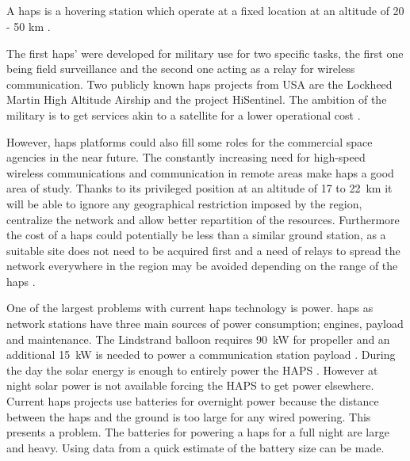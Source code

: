 \newpage 
\subsection{}
A \gls{haps} is a hovering station which operate at a fixed location at an altitude of 20 - 50 km \citep{manual:radio_regulation}.

The first \gls{haps}' were developed for military use for two specific tasks, the first one being field surveillance and the second one acting as a relay for wireless communication. 
Two publicly known \gls{haps} projects from USA are the Lockheed Martin High Altitude Airship and the project HiSentinel. The ambition of the military is to get services akin to a satellite for a lower operational cost \citep{article:Different_models_HAPS}.

However, \gls{haps} platforms could also fill some roles for the commercial space agencies in the near future. The constantly increasing need for high-speed wireless communications and communication in remote areas make \gls{haps} a good area of study. 
Thanks to its privileged position at an altitude of 17 to \SI{22}{km} it will be able to ignore any geographical restriction imposed by the region, centralize the network and allow better repartition of the resources.
Furthermore the cost of a \gls{haps} could potentially be less than a similar ground station, as a suitable site does not need to be acquired first and a need of relays to spread the network everywhere in the region may be avoided depending on the range of the \gls{haps} \citep{sci_article:haps_for_wireless_comm}.

One of the largest problems with current \gls{haps} technology is power. \gls{haps} as network stations have three main sources of power consumption; engines, payload and maintenance. The Lindstrand balloon requires \SI{90}{\kilo\watt} for propeller and an additional \SI{15}{\kilo\watt} is needed to power a communication station payload \citep{TechReport:HAPS_power}. During the day the solar energy is enough to entirely power the HAPS \citep{sci_article:haps_solar_power}.
However at night solar power is not available forcing the HAPS to get power elsewhere. Current \gls{haps} projects use batteries for overnight power because the distance between the \gls{haps} and the ground is too large for any wired powering.
This presents a problem. The batteries for powering a \gls{haps} for a full night are large and heavy. Using data from \cite{TechReport:HAPS_power} a quick estimate of the battery size can be made.

